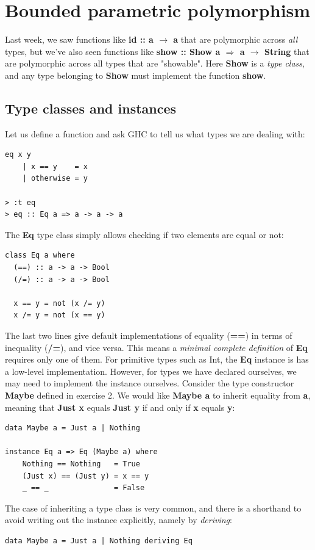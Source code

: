 \documentclass{article}
\begin{document}
\section{Bounded parametric polymorphism}
Last week, we saw functions like \textbf{id :: a $\rightarrow$ a} that are polymorphic across \emph{all} types, but we've also seen functions like \textbf{show :: Show a $\Rightarrow$ a $\rightarrow$ String} that are polymorphic across all types that are "showable". Here \textbf{Show} is a \emph{type class}, and any type belonging to \textbf{Show} must implement the function \textbf{show}.

\subsection{Type classes and instances}
Let us define a function and ask GHC to tell us what types we are dealing with:
\lstset{language=Haskell}
\begin{lstlisting}
eq x y
    | x == y    = x
    | otherwise = y
    
> :t eq
> eq :: Eq a => a -> a -> a
\end{lstlisting}
 The \textbf{Eq} type class simply allows checking if two elements are equal or not:
\begin{lstlisting}
class Eq a where
  (==) :: a -> a -> Bool
  (/=) :: a -> a -> Bool
  
  x == y = not (x /= y)
  x /= y = not (x == y)
\end{lstlisting}
The last two lines give default implementations of equality (\textbf{==}) in terms of inequality (\textbf{/=}), and vice versa. This means a \emph{minimal complete definition} of \textbf{Eq} requires only one of them. For primitive types such as Int, the \textbf{Eq} instance is has a low-level implementation. However, for types we have declared ourselves, we may need to implement the instance ourselves. Consider the type constructor \textbf{Maybe} defined in exercise 2. We would like \textbf{Maybe a} to inherit equality from \textbf{a}, meaning that \textbf{Just x} equals \textbf{Just y} if and only if \textbf{x} equals \textbf{y}:
\begin{lstlisting}
data Maybe a = Just a | Nothing

instance Eq a => Eq (Maybe a) where
    Nothing == Nothing   = True
    (Just x) == (Just y) = x == y
    _ == _               = False
\end{lstlisting}
The case of inheriting a type class is very common, and there is a shorthand to avoid writing out the instance explicitly, namely by \emph{deriving}:
\begin{lstlisting}
data Maybe a = Just a | Nothing deriving Eq
\end{lstlisting}
\end{document}
